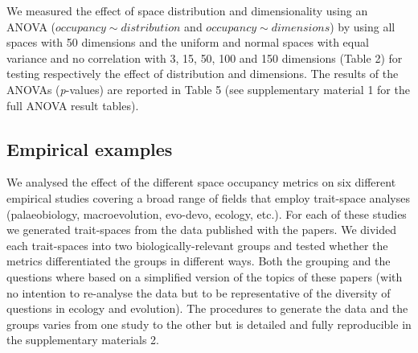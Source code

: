 \documentclass[]{article}
\begin{document}
We measured the effect of space distribution and dimensionality using an
ANOVA (\(occupancy \sim distribution\) and
\(occupancy \sim dimensions\)) by using all spaces with 50 dimensions
and the uniform and normal spaces with equal variance and no correlation
with 3, 15, 50, 100 and 150 dimensions (Table 2) for testing
respectively the effect of distribution and dimensions. The results of
the ANOVAs (\emph{p}-values) are reported in Table 5 (see supplementary
material 1 for the full ANOVA result tables).

\subsection{Empirical examples}\label{empirical-examples}

We analysed the effect of the different space occupancy metrics on six
different empirical studies covering a broad range of fields that employ
trait-space analyses (palaeobiology, macroevolution, evo-devo, ecology,
etc.). For each of these studies we generated trait-spaces from the data
published with the papers. We divided each trait-spaces into two
biologically-relevant groups and tested whether the metrics
differentiated the groups in different ways. Both the grouping and the
questions where based on a simplified version of the topics of these
papers (with no intention to re-analyse the data but to be
representative of the diversity of questions in ecology and evolution).
The procedures to generate the data and the groups varies from one study
to the other but is detailed and fully reproducible in the supplementary
materials 2.

\renewcommand\baselinestretch{1}\selectfont
\end{document}
